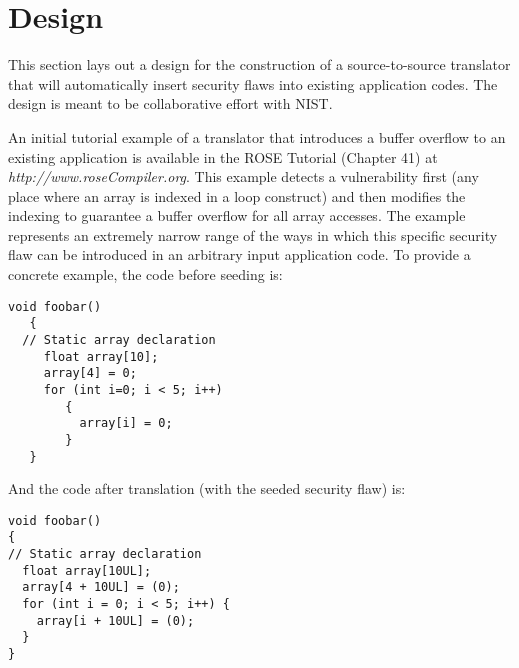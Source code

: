 \section{Design}

   This section lays out a design for the construction of a source-to-source
translator that will automatically insert security flaws into existing application codes.
The design is meant to be collaborative effort with NIST.

An initial tutorial example of a translator that introduces a 
buffer overflow to an existing application is available in the ROSE Tutorial
(Chapter 41) at {\em http://www.roseCompiler.org}.  This example detects a
vulnerability first (any place where an array is indexed in a loop construct)
and then modifies the indexing to guarantee a buffer overflow for all
array accesses.  The example represents an extremely narrow range of
the ways in which this specific security flaw can be introduced in an
arbitrary input application code.  To provide a concrete example, the code 
before seeding is:
{\mySmallFontSize
\begin{verbatim}
void foobar()
   {
  // Static array declaration
     float array[10];
     array[4] = 0;
     for (int i=0; i < 5; i++)
        {
          array[i] = 0;
        }
   }
\end{verbatim}
}
And the code after translation (with the seeded security flaw) is:
{\mySmallFontSize
\begin{verbatim}
void foobar()
{
// Static array declaration
  float array[10UL];
  array[4 + 10UL] = (0);
  for (int i = 0; i < 5; i++) {
    array[i + 10UL] = (0);
  }
}
\end{verbatim}
}

